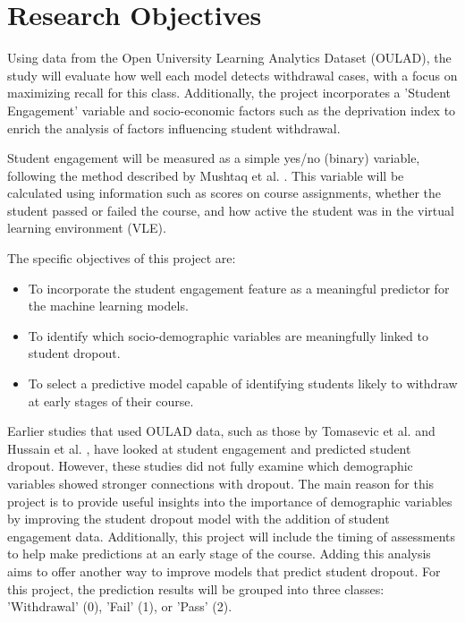 \documentclass[ %
                    author={Carlos Duran Calle},
                supervisor={Dr. Felipe Campelo},
                    degree={MSc},
                     title={Comparative Machine Learning Analysis for Student Dropout Prediction in a Virtual Learning Environment},
                  subtitle={Incorporating Student Engagement and Socio-Economic Features},
                      type={},
                      year={2025}]{dissertation}
\begin{document}
\section{Research Objectives}
Using data from the Open University Learning Analytics Dataset (OULAD), the study will evaluate how well each model detects withdrawal cases, with a focus on maximizing recall for this class. Additionally, the project incorporates a 'Student Engagement' variable \cite{hussain_student_engagement_prediction_2018} and socio-economic factors such as the deprivation index to enrich the analysis of factors influencing student withdrawal.

Student engagement will be measured as a simple yes/no (binary) variable, following the method described by Mushtaq et al. \cite{hussain_student_engagement_prediction_2018}. This variable will be calculated using information such as scores on course assignments, whether the student passed or failed the course, and how active the student was in the virtual learning environment (VLE).

\noindent
The specific objectives of this project are:
\begin{itemize}
	\item To incorporate the student engagement feature as a meaningful predictor for the machine learning models.
	\item To identify which socio-demographic variables are meaningfully linked to student dropout.
	\item To select a predictive model capable of identifying students likely to withdraw at early stages of their course.
\end{itemize}

Earlier studies that used OULAD data, such as those by Tomasevic et al. \cite{tomasevic_comparison_supervised_data_2020} and Hussain et al. \cite{hussain_student_engagement_prediction_2018}, have looked at student engagement and predicted student dropout. However, these studies did not fully examine which demographic variables showed stronger connections with dropout. The main reason for this project is to provide useful insights into the importance of demographic variables by improving the student dropout model with the addition of student engagement data. Additionally, this project will include the timing of assessments to help make predictions at an early stage of the course. Adding this analysis aims to offer another way to improve models that predict student dropout. For this project, the prediction results will be grouped into three classes: 'Withdrawal' (0), 'Fail' (1), or 'Pass' (2).
\end{document}
